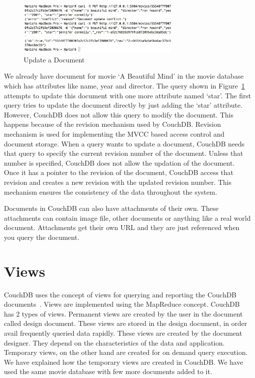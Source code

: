 \documentclass{sig-alternate}
\begin{document}
\begin{figure}
  \centering
  \includegraphics[width=80mm]{update.jpg}
  \caption{Update a Document
    \label{fig:update}}
  \end{figure}

We already have document for movie `A Beautiful Mind' in the movie database which has attributes like name, year and director. The query shown in Figure~\ref{fig:update} attempts to update this document with one more attribute named `star'. The first query tries to update the document directly by just adding the `star' attribute. However, CouchDB does not allow this query to modify the document. This happens because of the revision mechanism used by CouchDB. Revision mechanism is used for implementing the MVCC based access control and document storage. When a query wants to update a document, CouchDB needs that query to specify the current revision number of the document. Unless that number is specified, CouchDB does not allow the updation of the document. Once it has a pointer to the revision of the document, CouchDB access that revision and creates a new revision with the updated revision number. This mechanism ensures the consistency of the data throughout the system.

Documents in CouchDB can also have attachments of their own. These attachments can contain image file, other documents or anything like a real world document. Attachments get their own URL and they are just referenced when you query the document.

\section{Views}
\label{views}
CouchDB uses the concept of views for querying and reporting the CouchDB documents~\cite{couchDBviews}. Views are implemented using the MapReduce concept. CouchDB has 2 types of views. Permanent views are created by the user in the document called design document. These views are stored in the design document, in order avail frequently queried data rapidly. These views are created by the document designer. They depend on the characteristics of the data and application. Temporary views, on the other hand are created for on demand query execution. We have explained how the temporary views are created in CouchDB. We have used the same movie database with few more documents added to it.
\end{document}
